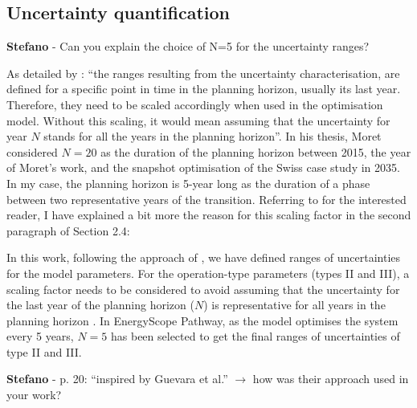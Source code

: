 \documentclass[12pt,a4paper]{article}
\begin{document}
\subsection{Uncertainty quantification}
\label{methodo_UQ}

\begin{mdframed}[style=comment] %
{\color{orange} \textbf{Stefano}} - Can you explain the choice of N=5 for the uncertainty ranges?
\end{mdframed}

\noindent As detailed by \citet{Moret2017PhDThesis}: ``the ranges resulting from the uncertainty characterisation, are defined for a specific point in time in the planning horizon, usually its last year. Therefore, they need to be scaled accordingly when used in the optimisation model. Without this scaling, it would mean assuming that the uncertainty for year $N$ stands for all the years in the planning horizon''. In his thesis, Moret considered $N=20$ as the duration of the planning horizon between 2015, the year of Moret's work, and the snapshot optimisation of the Swiss case study in 2035. In my case, the planning horizon is 5-year long as the duration of a phase between two representative years of the transition. Referring to \citet{Moret2017PhDThesis} for the interested reader, I have explained a bit more the reason for this scaling factor {\color{blue}in the second paragraph of Section 2.4}:

\begin{mdframed}[style=manuscript] %
In this work, following the approach of \citet{Moret2017PhDThesis}, we have defined ranges of uncertainties for the model parameters.  For the operation-type parameters (types II and III), a scaling factor needs to be considered to avoid assuming that the uncertainty for the last year of the planning horizon ($N$) is representative for all years in the planning horizon \citet{Moret2017PhDThesis}. In EnergyScope Pathway, as the model optimises the system every 5 years, $N=5$ has been selected to get the final ranges of uncertainties of type II and III. 
\end{mdframed}

\begin{mdframed}[style=comment] %
{\color{orange} \textbf{Stefano}} - p. 20: ``inspired by Guevara et al.'' $\rightarrow$ how was their approach used in your work?
\end{mdframed}
\end{document}
